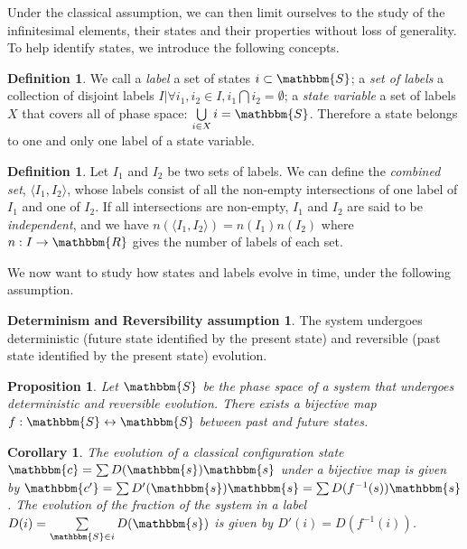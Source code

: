 \documentclass[aps,pra,10pt,twocolumn,floatfix,nofootinbib]{revtex4-1}
\newtheorem{cor}[thm]{Corollary}
\newtheorem{prop}[thm]{Proposition}
\theoremstyle{definition}
\newtheorem{defn}[thm]{Definition}
\newtheorem*{assump2}{Determinism and Reversibility assumption}
\begin{document}
Under the classical assumption, we can then limit ourselves to the study of the infinitesimal elements, their states and their properties without loss of generality. To help identify states, we introduce the following concepts.

\begin{defn}\label{label}
We call a \emph{label} a set of states $i\subset\mathbbm{S}$; a \emph{set of labels} a collection of disjoint labels $I | \forall i_1,i_2\in I, i_1\bigcap i_2 = \emptyset$; a \emph{state variable} a set of labels $X$ that covers all of phase space: $\bigcup\limits_{i \in X}i=\mathbbm{S}$. Therefore a state belongs to one and only one label of a state variable.
\end{defn}

\begin{defn}\label{labelsCombine}
Let $I_1$ and $I_2$ be two sets of labels. We can define the \emph{combined set}, $\langle I_1, I_2 \rangle$, whose labels consist of all the non-empty intersections of one label of $I_1$ and one of $I_2$. If all intersections are non-empty, $I_1$ and $I_2$ are said to be \emph{independent}, and we have $n(\langle I_1, I_2 \rangle)=n(I_1)n(I_2)$ where $n: I \rightarrow \mathbbm{R}$ gives the number of labels of each set.
\end{defn}

We now want to study how states and labels evolve in time, under the following assumption.

\begin{assump2}
The system undergoes deterministic (future state identified by the present state) and reversible (past state identified by the present state) evolution.
\end{assump2}

\begin{prop}\label{detrevMap}
Let $\mathbbm{S}$ be the phase space of a system that undergoes deterministic and reversible evolution. There exists a bijective map $f:\mathbbm{S} \leftrightarrow \mathbbm{S}$ between past and future states.
\end{prop}

\begin{cor}\label{detrevDist}
The evolution of a classical configuration state $\mathbbm{c}=\sum D(\mathbbm{s}) \mathbbm{s}$ under a bijective map is given by $\mathbbm{c'}=\sum D'(\mathbbm{s}) \mathbbm{s}=\sum D(f^{-1}(s)) \mathbbm{s}$. The evolution of the fraction of the system in a label $D(i)=\sum\limits_{\mathbbm{S} \in i} D(\mathbbm{s})$ is given by $D'(i)=D(f^{-1}(i))$.
\end{cor}
\end{document}
